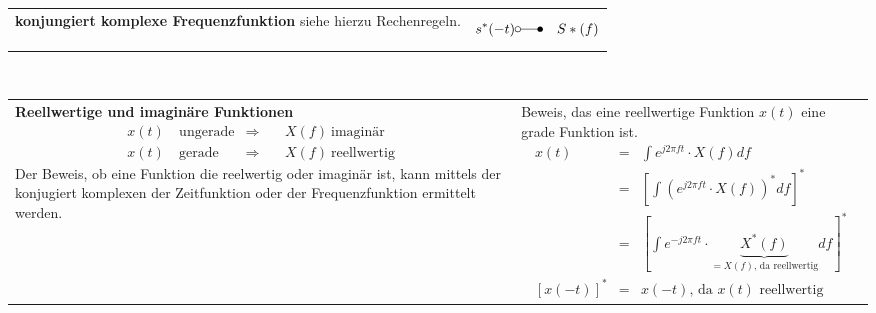\vspace{6pt}
\begin{tabular}{ll}
 \addtolength{\jot}{2mm}
 \parbox{7cm}{
  \centering
\textbf{konjungiert komplexe Frequenzfunktion}
\flushleft
siehe hierzu Rechenregeln.
}
 &
 \parbox{5cm}{
 \begin{eqnarray*}
s^*(-t) &\laplace& S*(f)
 \end{eqnarray*}
}
\end{tabular}\\
\vspace{6pt}
\begin{tabular}{ll}
 \addtolength{\jot}{2mm}
 \parbox{7cm}{
   \centering
\textbf{Reellwertige und imaginäre Funktionen}
\flushleft
\begin{align*}
x(t)  ~&\text{ungerade} &\Rightarrow& ~&X(f) ~\text{imaginär}\\
x(t)  ~&\text{gerade} &\Rightarrow& ~&X(f) ~\text{reellwertig}
\end{align*}
Der Beweis, ob eine Funktion die reelwertig oder imaginär ist, kann mittels der konjugiert komplexen der Zeitfunktion oder der Frequenzfunktion ermittelt werden.
}
 &
 \parbox{5cm}{
 Beweis, das eine reellwertige Funktion $x(t)$ eine grade Funktion ist.
 \begin{eqnarray*}
x(t) &=& \int e^{j2 \pi ft} \cdot X(f) df\\
 &=& \left[ \int \left( e^{j2 \pi ft} \cdot  X(f)\right)^*  df \right]^* \\
  &=& \left[ \int e^{-j2 \pi ft} \cdot \underbrace{X^*(f)}_\text{$=X(f)$, da reellwertig} df \right]^* \\
  \left[x(-t) \right]^* &=& x(-t)\text{, da $x(t)$ reellwertig}
 \end{eqnarray*}
}
\end{tabular}\\

